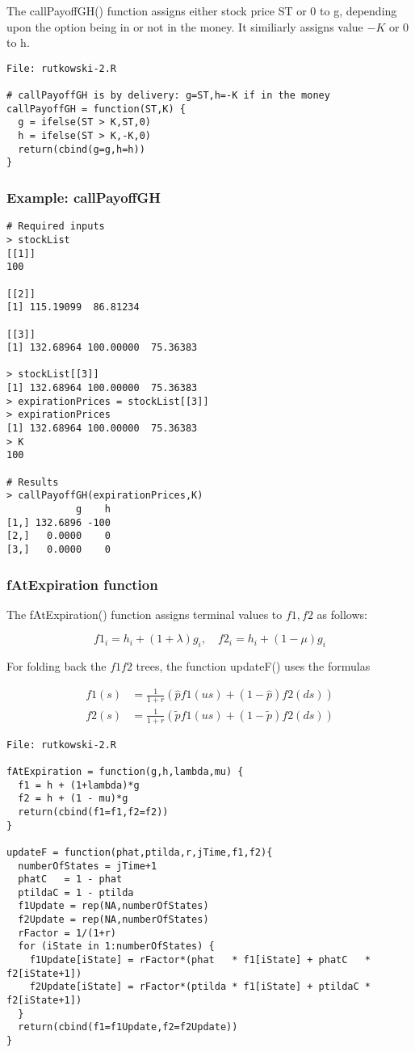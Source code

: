 \documentclass[10pt]{article}
\begin{document}
The callPayoffGH() function assigns either stock price ST or 0 to g,
depending upon the option being in or not in the money.
It similiarly assigns value $-K$ or 0 to h.


\begin{verbatim}
File: rutkowski-2.R

# callPayoffGH is by delivery: g=ST,h=-K if in the money
callPayoffGH = function(ST,K) {
  g = ifelse(ST > K,ST,0)
  h = ifelse(ST > K,-K,0)
  return(cbind(g=g,h=h))
}
\end{verbatim}

\subsubsection*{Example: callPayoffGH}

\begin{verbatim}
# Required inputs
> stockList
[[1]]
100

[[2]]
[1] 115.19099  86.81234

[[3]]
[1] 132.68964 100.00000  75.36383

> stockList[[3]]
[1] 132.68964 100.00000  75.36383
> expirationPrices = stockList[[3]]
> expirationPrices
[1] 132.68964 100.00000  75.36383
> K
100

# Results
> callPayoffGH(expirationPrices,K)
            g    h
[1,] 132.6896 -100
[2,]   0.0000    0
[3,]   0.0000    0
\end{verbatim}

\subsubsection*{fAtExpiration function}

The fAtExpiration() function assigns terminal values to $f1,f2$ as follows:

\[
f1_i = h_i + (1 + \lambda)g_i,\quad f2_i = h_i + (1-\mu)g_i
\]

For folding back the $f1f2$ trees, the function updateF() uses the formulas

\begin{align*}
    f1(s) &= \frac{1}{1+r}(\hat{p} f1(u s) + (1 - \hat{p})f2(d s))\\
    f2(s) &= \frac{1}{1+r}(\tilde{p} f1(u s) + (1 - \tilde{p})f2(d s))
\end{align*}


\begin{verbatim}
File: rutkowski-2.R

fAtExpiration = function(g,h,lambda,mu) {
  f1 = h + (1+lambda)*g
  f2 = h + (1 - mu)*g
  return(cbind(f1=f1,f2=f2))
}

updateF = function(phat,ptilda,r,jTime,f1,f2){
  numberOfStates = jTime+1
  phatC   = 1 - phat
  ptildaC = 1 - ptilda
  f1Update = rep(NA,numberOfStates)
  f2Update = rep(NA,numberOfStates)
  rFactor = 1/(1+r)
  for (iState in 1:numberOfStates) {
    f1Update[iState] = rFactor*(phat   * f1[iState] + phatC   * f2[iState+1])
    f2Update[iState] = rFactor*(ptilda * f1[iState] + ptildaC * f2[iState+1])
  }
  return(cbind(f1=f1Update,f2=f2Update))
}
\end{verbatim}
\end{document}
